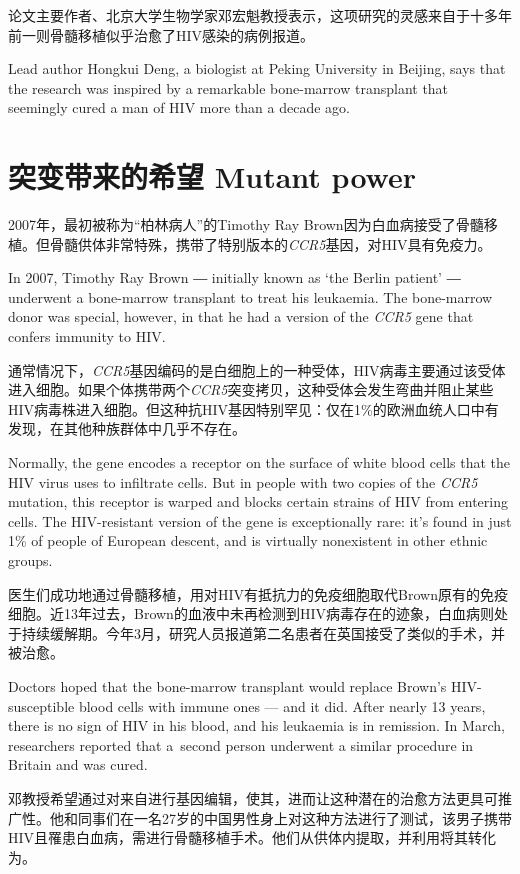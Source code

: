 \begin{multicols}{2}
论文主要作者、北京大学生物学家邓宏魁教授表示，这项研究的灵感来自于十多年前一则骨髓移植似乎治愈了HIV感染的病例报道。

Lead author Hongkui Deng, a biologist at Peking University in Beijing, says that the research was inspired by a remarkable bone-marrow transplant that seemingly cured a man of HIV more than a decade ago.

\section*{突变带来的希望 Mutant power}

2007年，最初被称为“柏林病人”的Timothy Ray Brown因为白血病接受了骨髓移植。但骨髓供体非常特殊，携带了特别版本的\textit{CCR5}基因，对HIV具有免疫力。

In 2007, Timothy Ray Brown ― initially known as ‘the Berlin patient’ ― underwent a bone-marrow transplant to treat his leukaemia. The bone-marrow donor was special, however, in that he had a version of the \textit{CCR5} gene that confers immunity to HIV.

通常情况下，\textit{CCR5}基因编码的是白细胞上的一种受体，HIV病毒主要通过该受体进入细胞。如果个体携带两个\textit{CCR5}突变拷贝，这种受体会发生弯曲并阻止某些HIV病毒株进入细胞。但这种抗HIV基因特别罕见：仅在1\%的欧洲血统人口中有发现，在其他种族群体中几乎不存在。

Normally, the gene encodes a receptor on the surface of white blood cells that the HIV virus uses to infiltrate cells. But in people with two copies of the \textit{CCR5} mutation, this receptor is warped and blocks certain strains of HIV from entering cells. The HIV-resistant version of the gene is exceptionally rare: it’s found in just 1\% of people of European descent, and is virtually nonexistent in other ethnic groups.

医生们成功地通过骨髓移植，用对HIV有抵抗力的免疫细胞取代Brown原有的免疫细胞。近13年过去，Brown的血液中未再检测到HIV病毒存在的迹象，白血病则处于持续缓解期。今年3月，研究人员报道第二名患者在英国接受了类似的手术，并被治愈。

Doctors hoped that the bone-marrow transplant would replace Brown’s HIV-susceptible blood cells with immune ones — and it did. After nearly 13 years, there is no sign of HIV in his blood, and his leukaemia is in remission. In March, researchers reported that a second person underwent a similar procedure in Britain and was cured.

邓教授希望通过对来自进行基因编辑，使其，进而让这种潜在的治愈方法更具可推广性。他和同事们在一名27岁的中国男性身上对这种方法进行了测试，该男子携带HIV且罹患白血病，需进行骨髓移植手术。他们从供体内提取，并利用将其转化为。


\end{multicols}
